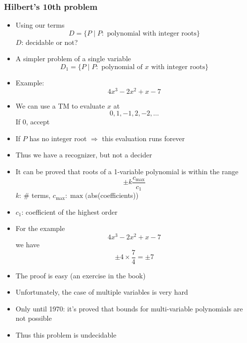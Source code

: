 \begin{frame}[allowframebreaks] \frametitle{Hilbert's 10th problem}
  \begin{itemize}
\item
Using our terms
\begin{equation*}
D=\{P\mid P: \text{ polynomial with integer roots}\}
\end{equation*}
$D$: decidable or not?
\item A simpler problem of a single variable
  \begin{equation*}
D_1=\{P\mid P: \text{ polynomial of $x$ with integer roots}\}
\end{equation*}
\item Example:
  \begin{equation*}
4x^3 - 2x^2 + x - 7
\end{equation*}
\item We can use a TM to
evaluate $x$ at
\begin{equation*}
0,1, -1, 2, -2, \ldots
\end{equation*}
If 0, accept
\item If $P$ has no integer root $\Rightarrow$
this evaluation runs forever

\item
  Thus we have a recognizer, but not a decider
\item It can be proved that roots of a 1-variable polynomial
  is within the range
  \begin{equation*}
    \pm k \frac{c_{\max}}{c_1}
  \end{equation*}
$k$: \# terms, $c_{\max}: \max($abs(coefficients))

\item [] $c_1$: coefficient of the highest order
\item For the example
  \begin{equation*}
4x^3 - 2x^2 + x - 7
\end{equation*}
we have
\begin{equation*}
  \pm 4 \times \frac{7}{4} = \pm 7
\end{equation*}

\item The proof is easy (an exercise in the book)
\item
  Unfortunately, the case of multiple variables is very hard
  
\item Only until 1970: it's proved
  that bounds for multi-variable polynomials
are not possible

\item
  Thus this problem is undecidable

\end{itemize}\end{frame}

